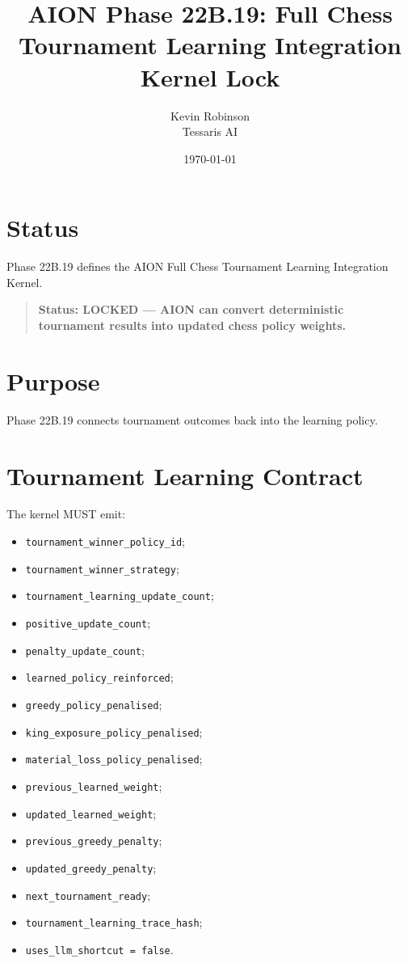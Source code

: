\documentclass[11pt,a4paper]{article}
\title{\textbf{AION Phase 22B.19: Full Chess Tournament Learning Integration Kernel Lock}}
\author{Kevin Robinson\\Tessaris AI}
\date{\today}
\begin{document}
\maketitle

\section{Status}

Phase 22B.19 defines the AION Full Chess Tournament Learning Integration Kernel.

\begin{quote}
\textbf{Status: LOCKED --- AION can convert deterministic tournament results into updated chess policy weights.}
\end{quote}

\section{Purpose}

Phase 22B.19 connects tournament outcomes back into the learning policy.

\section{Tournament Learning Contract}

The kernel MUST emit:

\begin{itemize}
  \item \texttt{tournament\_winner\_policy\_id};
  \item \texttt{tournament\_winner\_strategy};
  \item \texttt{tournament\_learning\_update\_count};
  \item \texttt{positive\_update\_count};
  \item \texttt{penalty\_update\_count};
  \item \texttt{learned\_policy\_reinforced};
  \item \texttt{greedy\_policy\_penalised};
  \item \texttt{king\_exposure\_policy\_penalised};
  \item \texttt{material\_loss\_policy\_penalised};
  \item \texttt{previous\_learned\_weight};
  \item \texttt{updated\_learned\_weight};
  \item \texttt{previous\_greedy\_penalty};
  \item \texttt{updated\_greedy\_penalty};
  \item \texttt{next\_tournament\_ready};
  \item \texttt{tournament\_learning\_trace\_hash};
  \item \texttt{uses\_llm\_shortcut = false}.
\end{itemize}
\end{document}
